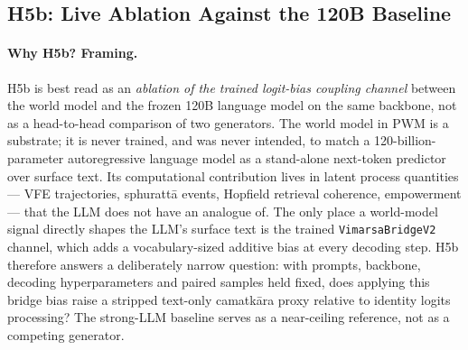 \documentclass[journal,onecolumn,11pt]{IEEEtran}
\begin{document}
\subsection{H5b: Live Ablation Against the 120B Baseline}\label{sec:h5b}

\paragraph{Why H5b? Framing.}
H5b is best read as an \emph{ablation of the trained logit-bias coupling
channel} between the world model and the frozen 120B language model on the
same backbone, not as a head-to-head comparison of two generators.
The world model in PWM is a substrate; it is never trained, and was never
intended, to match a 120-billion-parameter autoregressive language model
as a stand-alone next-token predictor over surface text.
Its computational contribution lives in latent process quantities --- VFE
trajectories, sphurattā events, Hopfield retrieval coherence, empowerment ---
that the LLM does not have an analogue of.
The only place a world-model signal directly shapes the LLM's surface text
is the trained \texttt{VimarsaBridgeV2} channel, which adds a vocabulary-sized
additive bias at every decoding step.
H5b therefore answers a deliberately narrow question: with prompts,
backbone, decoding hyperparameters and paired samples held fixed, does
applying this bridge bias raise a stripped text-only camatkāra proxy
relative to identity logits processing?
The strong-LLM baseline serves as a near-ceiling reference, not as a
competing generator.
\end{document}
